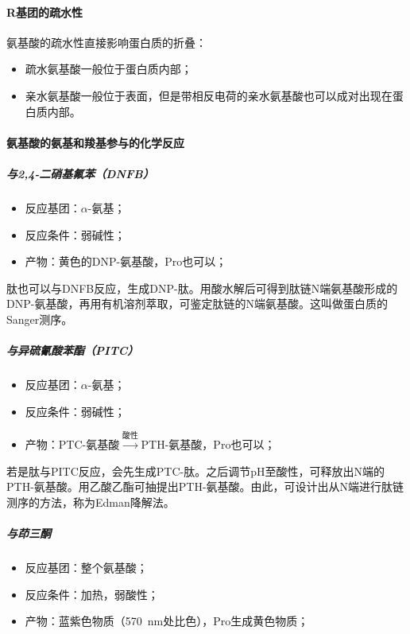 \paragraph{R基团的疏水性}

氨基酸的疏水性直接影响蛋白质的折叠：
\begin{itemize}
	\item 疏水氨基酸一般位于蛋白质内部；
	\item 亲水氨基酸一般位于表面，但是带相反电荷的亲水氨基酸也可以成对出现在蛋白质内部。
\end{itemize}

\paragraph{氨基酸的氨基和羧基参与的化学反应}

\subparagraph{与2,4-二硝基氟苯（DNFB）}

\begin{itemize}
	\item 反应基团：$\alpha$-氨基；
	\item 反应条件：弱碱性；
	\item 产物：黄色的DNP-氨基酸，Pro也可以；
\end{itemize}

肽也可以与DNFB反应，生成DNP-肽。用酸水解后可得到肽链N端氨基酸形成的DNP-氨基酸，再用有机溶剂萃取，可鉴定肽链的N端氨基酸。这叫做蛋白质的Sanger测序。

\subparagraph{与异硫氰酸苯酯（PITC）}

\begin{itemize}
	\item 反应基团：$\alpha$-氨基；
	\item 反应条件：弱碱性；
	\item 产物：PTC-氨基酸$\xrightarrow{\text{酸性}}$PTH-氨基酸，Pro也可以；
\end{itemize}

若是肽与PITC反应，会先生成PTC-肽。之后调节pH至酸性，可释放出N端的PTH-氨基酸。用乙酸乙酯可抽提出PTH-氨基酸。由此，可设计出从N端进行肽链测序的方法，称为Edman降解法。

\subparagraph{与茚三酮}

\begin{itemize}
	\item 反应基团：整个氨基酸；
	\item 反应条件：加热，弱酸性；
	\item 产物：蓝紫色物质（\SI{570}{\nm}处比色），Pro生成黄色物质；
\end{itemize}

